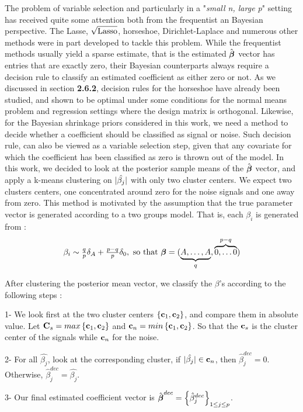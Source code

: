 \documentclass[10pt]{article}
\begin{document}
The problem of variable selection and particularly in a "\textit{small n, large p}" setting has received quite some attention both from  the frequentist an Bayesian perspective. The Lasse, $\sqrt{\text{\rm{Lasso}}}$, horseshoe, Dirichlet-Laplace and numerous other methods were in part developed to tackle this problem. While the frequentist methods usually yield a sparse estimate, that is the estimated $\hat{\boldsymbol{\beta}}$ vector has entries that are exactly zero, their Bayesian counterparts always require a decision rule to classify an estimated coefficient as either zero or not. As we discussed in section \textbf{2.6.2}, decision rules for the horseshoe have already been studied, and shown to be optimal under some conditions for the normal means problem and regression settings where the design matrix is orthogonal. Likewise, for the Bayesian shrinkage priors considered in this work, we need a method to decide whether a coefficient should be classified as signal or noise. Such decision rule, can also be viewed as a variable selection step, given that any covariate for which the coefficient has been classified as zero is thrown out of the model. In this work, we decided to look at the posterior sample means of the $\hat{\boldsymbol{\beta}}$ vector, and apply a k-means clustering on $\lvert\hat{\beta_j}\rvert $ with only two cluster centers. We expect two clusters centers, one concentrated around zero for the noise signals and one away from zero. This method is motivated by the assumption that the true parameter vector is generated according to a two groups model. That is, each $\beta_i$ is generated from : 
$$ \beta_i \sim \tfrac{q}{p} \delta_{A} + \tfrac{p-q}{p} \delta_{0}, \ \text{so that }  \boldsymbol{\beta} = ( \underbrace{ A, \ldots ,A}_{q}, \overbrace{0, \ldots 0}^{p-q} ) $$

After clustering the posterior mean vector, we classify the $\beta$'s according to the following steps : 
\ben
\item[1-] We look first at the two cluster centers $\left\lbrace {\bf c}_1 , {\bf c}_2 \right\rbrace $, and compare them in absolute value. Let ${\bf C}_s = max\left\lbrace {\bf c}_1 , {\bf c}_2 \right\rbrace$ and ${\bf c}_n = min\left\lbrace {\bf c}_1 , {\bf c}_2 \right\rbrace$. So that the ${\bf c}_s$ is the cluster center of the signals while ${\bf c}_n$ for the noise.
\item[2-] For all $\hat{\beta_j}$, look at the corresponding cluster, if $\lvert\hat{\beta_j}\rvert \in {\bf c}_n $, then $\hat{\beta}_j^{dec}= 0$. Otherwise, $\hat{\beta}_j^{dec} = \hat{\beta_j}$.
\item[3-] Our final estimated coefficient vector is $\hat{\boldsymbol{\beta}}^{dec} = \left\lbrace \hat{\beta}^{dec}_{j} \right\rbrace_{1\leq j \leq p}$.
\een
\end{document}
